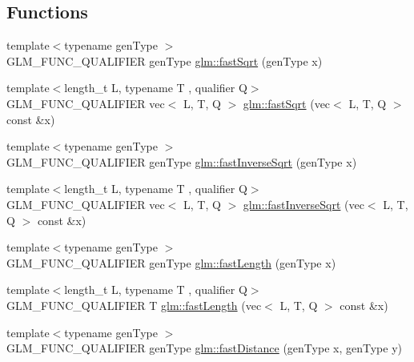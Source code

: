 \subsection*{Functions}
\begin{DoxyCompactItemize}
\item 
{\footnotesize template$<$typename gen\+Type $>$ }\\G\+L\+M\+\_\+\+F\+U\+N\+C\+\_\+\+Q\+U\+A\+L\+I\+F\+I\+ER gen\+Type \hyperlink{group__gtx__fast__square__root_ga6c460e9414a50b2fc455c8f64c86cdc9}{glm\+::fast\+Sqrt} (gen\+Type x)
\item 
{\footnotesize template$<$length\+\_\+t L, typename T , qualifier Q$>$ }\\G\+L\+M\+\_\+\+F\+U\+N\+C\+\_\+\+Q\+U\+A\+L\+I\+F\+I\+ER vec$<$ L, T, Q $>$ \hyperlink{group__gtx__fast__square__root_gae83f0c03614f73eae5478c5b6274ee6d}{glm\+::fast\+Sqrt} (vec$<$ L, T, Q $>$ const \&x)
\item 
{\footnotesize template$<$typename gen\+Type $>$ }\\G\+L\+M\+\_\+\+F\+U\+N\+C\+\_\+\+Q\+U\+A\+L\+I\+F\+I\+ER gen\+Type \hyperlink{group__gtx__fast__square__root_ga7f081b14d9c7035c8714eba5f7f75a8f}{glm\+::fast\+Inverse\+Sqrt} (gen\+Type x)
\item 
{\footnotesize template$<$length\+\_\+t L, typename T , qualifier Q$>$ }\\G\+L\+M\+\_\+\+F\+U\+N\+C\+\_\+\+Q\+U\+A\+L\+I\+F\+I\+ER vec$<$ L, T, Q $>$ \hyperlink{group__gtx__fast__square__root_gadcd7be12b1e5ee182141359d4c45dd24}{glm\+::fast\+Inverse\+Sqrt} (vec$<$ L, T, Q $>$ const \&x)
\item 
{\footnotesize template$<$typename gen\+Type $>$ }\\G\+L\+M\+\_\+\+F\+U\+N\+C\+\_\+\+Q\+U\+A\+L\+I\+F\+I\+ER gen\+Type \hyperlink{group__gtx__fast__square__root_gafe697d6287719538346bbdf8b1367c59}{glm\+::fast\+Length} (gen\+Type x)
\item 
{\footnotesize template$<$length\+\_\+t L, typename T , qualifier Q$>$ }\\G\+L\+M\+\_\+\+F\+U\+N\+C\+\_\+\+Q\+U\+A\+L\+I\+F\+I\+ER T \hyperlink{group__gtx__fast__square__root_ga90f66be92ef61e705c005e7b3209edb8}{glm\+::fast\+Length} (vec$<$ L, T, Q $>$ const \&x)
\item 
{\footnotesize template$<$typename gen\+Type $>$ }\\G\+L\+M\+\_\+\+F\+U\+N\+C\+\_\+\+Q\+U\+A\+L\+I\+F\+I\+ER gen\+Type \hyperlink{group__gtx__fast__square__root_gaac333418d0c4e0cc6d3d219ed606c238}{glm\+::fast\+Distance} (gen\+Type x, gen\+Type y)

\end{DoxyCompactItemize}

